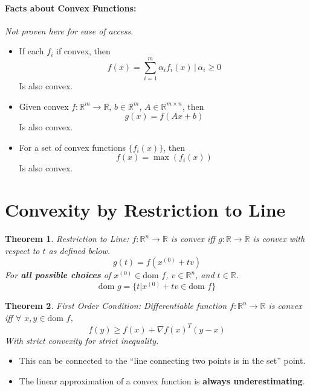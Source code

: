 \documentclass[a4paper,12pt]{report}
\def\reals{\mathbb{R}}
\newtheorem{theorem}{Theorem}
\begin{document}
\paragraph{Facts about Convex Functions: } \textit{Not proven here for ease of access.} 
\begin{itemize}
\item If each $f_i$ if convex, then 
\begin{equation}
f(x) = \sum_{i=1}^{m} \alpha_i f_i(x)\, | \, \alpha_i \geq 0
\end{equation}
Is also convex.

\item Given convex $f:\mathbb R^m \to \mathbb R$, $b\in \mathbb R^m$, $A\in \mathbb R^{m\times n}$, then 
\begin{equation}
g(x) = f(Ax + b)
\end{equation}
Is also convex. 

\item For a set of convex functions $\{f_i(x)\}$, then 
\begin{equation}
f(x) = \max(f_i(x))
\end{equation}
Is also convex.
\end{itemize}


\section{Convexity by Restriction to Line}

\begin{theorem}{Restriction to Line: }
$f:\reals^n \to \reals$ is convex iff $g:\reals \to \reals$ is convex with respect to $t$ as defined below.
\begin{equation}
g(t) = f(x^{(0)} + tv)
\end{equation}
For \textbf{all possible choices} of $x^{(0)} \in \text{dom }f$, $v\in \reals^n$, and $t\in \reals$.
\begin{equation}
\text{dom }g = \{t | x^{(0)} +tv \in \text{dom }f \}
\end{equation}
\end{theorem}


\begin{theorem}{First Order Condition: }
Differentiable function $f:\reals^n\to \reals$ is convex iff $\forall$ $x,y\in \text{dom }f$,
\begin{equation}
f(y) \geq f(x) + \nabla f(x)^T (y-x)
\end{equation}
With strict convexity for strict inequality.
\end{theorem}
\begin{itemize}
\item This can be connected to the ``line connecting two points is in the set'' point.
\item The linear approximation of a convex function is \textbf{always underestimating}.
\end{itemize}
\end{document}
